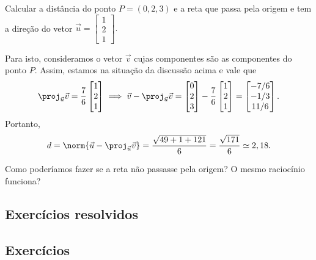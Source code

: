 \begin{ex}
	Calcular a distância do ponto $P = (0,2,3)$ e a reta que passa pela origem e tem a direção do vetor $\vec{u} =
	\begin{bmatrix}
	1 \\ 2 \\1
	\end{bmatrix}.$

	Para isto, consideramos o vetor $\vec{v}$ cujas componentes são as componentes do ponto $P$. Assim, estamos na situação da discussão acima e vale que
	\begin{equation}
	\proj_{\vec{u}} \vec{v} = \frac{7}{6}
	\begin{bmatrix}
	1 \\ 2 \\1
	\end{bmatrix} \implies
	\vec{v} - \proj_{\vec{u}} \vec{v} =
	\begin{bmatrix}
	0 \\ 2 \\ 3
	\end{bmatrix} - \frac{7}{6}
	\begin{bmatrix}
	1 \\ 2 \\1
	\end{bmatrix} =
	\begin{bmatrix}
	-7/6 \\ -1/3 \\ 11/6
	\end{bmatrix}.
	\end{equation} Portanto,
	\begin{equation}
	d = \norm{\vec{u} - \proj_{\vec{u}} \vec{v}} = \frac{\sqrt{49 + 1 + 121}}{6} = \frac{\sqrt{171}}{6} \simeq 2,18.
	\end{equation}
\end{ex}

\begin{exer}
	Como poderíamos fazer se a reta não passasse pela origem? O mesmo raciocínio funciona?
\end{exer}

\subsection*{Exercícios resolvidos}

\construirExeresol

\subsection*{Exercícios}

